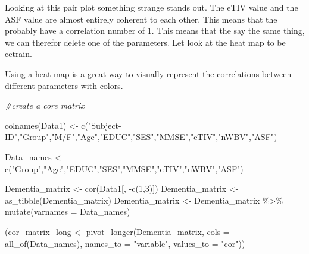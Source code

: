\documentclass[
]{article}
\newenvironment{Shaded}{\begin{snugshade}}{\end{snugshade}}
\newcommand{\AttributeTok}[1]{\textcolor[rgb]{0.77,0.63,0.00}{#1}}
\newcommand{\CommentTok}[1]{\textcolor[rgb]{0.56,0.35,0.01}{\textit{#1}}}
\newcommand{\DecValTok}[1]{\textcolor[rgb]{0.00,0.00,0.81}{#1}}
\newcommand{\FunctionTok}[1]{\textcolor[rgb]{0.00,0.00,0.00}{#1}}
\newcommand{\NormalTok}[1]{#1}
\newcommand{\OtherTok}[1]{\textcolor[rgb]{0.56,0.35,0.01}{#1}}
\newcommand{\SpecialCharTok}[1]{\textcolor[rgb]{0.00,0.00,0.00}{#1}}
\newcommand{\StringTok}[1]{\textcolor[rgb]{0.31,0.60,0.02}{#1}}
\begin{document}
Looking at this pair plot something strange stands out. The eTIV value
and the ASF value are almost entirely coherent to each other. This means
that the probably have a correlation number of 1. This means that the
say the same thing, we can therefor delete one of the parameters. Let
look at the heat map to be cetrain.

Using a heat map is a great way to visually represent the correlations
between different parameters with colors.

\begin{Shaded}
\begin{Highlighting}[]
\CommentTok{\#create a core matrix}

\FunctionTok{colnames}\NormalTok{(Data1) }\OtherTok{\textless{}{-}} \FunctionTok{c}\NormalTok{(}\StringTok{"Subject{-}ID"}\NormalTok{,}\StringTok{"Group"}\NormalTok{,}\StringTok{"M/F"}\NormalTok{,}\StringTok{"Age"}\NormalTok{,}\StringTok{"EDUC"}\NormalTok{,}\StringTok{"SES"}\NormalTok{,}\StringTok{"MMSE"}\NormalTok{,}\StringTok{"eTIV"}\NormalTok{,}\StringTok{"nWBV"}\NormalTok{,}\StringTok{"ASF"}\NormalTok{)}

\NormalTok{Data\_names }\OtherTok{\textless{}{-}} \FunctionTok{c}\NormalTok{(}\StringTok{"Group"}\NormalTok{,}\StringTok{"Age"}\NormalTok{,}\StringTok{"EDUC"}\NormalTok{,}\StringTok{"SES"}\NormalTok{,}\StringTok{"MMSE"}\NormalTok{,}\StringTok{"eTIV"}\NormalTok{,}\StringTok{"nWBV"}\NormalTok{,}\StringTok{"ASF"}\NormalTok{)}

\NormalTok{Dementia\_matrix }\OtherTok{\textless{}{-}} \FunctionTok{cor}\NormalTok{(Data1[, }\SpecialCharTok{{-}}\FunctionTok{c}\NormalTok{(}\DecValTok{1}\NormalTok{,}\DecValTok{3}\NormalTok{)])}
\NormalTok{Dementia\_matrix }\OtherTok{\textless{}{-}} \FunctionTok{as\_tibble}\NormalTok{(Dementia\_matrix)}
\NormalTok{Dementia\_matrix }\OtherTok{\textless{}{-}}\NormalTok{ Dementia\_matrix }\SpecialCharTok{\%\textgreater{}\%} \FunctionTok{mutate}\NormalTok{(}\AttributeTok{varnames =}\NormalTok{ Data\_names)}


\NormalTok{(cor\_matrix\_long }\OtherTok{\textless{}{-}} \FunctionTok{pivot\_longer}\NormalTok{(Dementia\_matrix, }
                                 \AttributeTok{cols =} \FunctionTok{all\_of}\NormalTok{(Data\_names), }
                                 \AttributeTok{names\_to =} \StringTok{"variable"}\NormalTok{, }
                                 \AttributeTok{values\_to =} \StringTok{"cor"}\NormalTok{))}
\end{Highlighting}
\end{Shaded}
\end{document}
